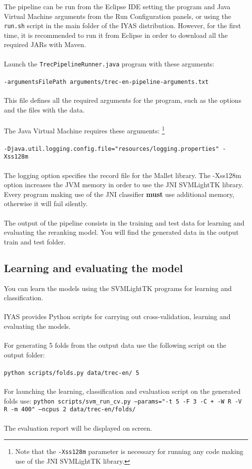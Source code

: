 \documentclass{wileysev}
\begin{document}
The pipeline can be run from the Eclipse IDE setting the program and Java Virtual Machine arguments from the Run Configuration panels, or using the \texttt{run.sh} script in the main folder of the IYAS distribution. However, for the first time, it is recommended to run it from Eclipse in order to download all the required JARs with Maven.
\\\\
Launch the \texttt{TrecPipelineRunner.java} program with these arguments:
\\\\
\texttt{-argumentsFilePath arguments/trec-en-pipeline-arguments.txt}
\\\\
This file defines all the required arguments for the program, such as the options and the files with the data.
\\\\
The Java Virtual Machine requires these arguments:%
\footnote{Note that the \texttt{-Xss128m} parameter is necessary for running 
any code making use of the JNI SVMLightTK library.}
\\\\
\texttt{-Djava.util.logging.config.file="resources/logging.properties" -Xss128m}
\\\\
The logging option specifies the record file for the Mallet library. The -Xss128m option increases the JVM memory in order to use the JNI SVMLightTK library. Every program making use of the JNI classifier \textbf{must} use additional memory, otherwise it will fail silently.
\\\\
The output of the pipeline consists in the training and test data for learning and evaluating the reranking model. You will find the generated data in the output train and test folder.

\subsection{Learning and evaluating the model}
You can learn the models using the SVMLightTK programs for learning and classification.
\\\\
IYAS provides Python scripts for carrying out cross-validation, learning and evaluating the models.
\\\\
For generating 5 folds from the output data use the following script on the output folder:
\\\\
\texttt{python scripts/folds.py data/trec-en/ 5}
\\\\
For launching the learning, classification and evaluation script on the generated folds use:
\texttt{python scripts/svm\_run\_cv.py --params="-t 5 -F 3 -C + -W R -V R -m 400" --ncpus 2 data/trec-en/folds/}
\\\\
The evaluation report will be displayed on screen.
\end{document}
